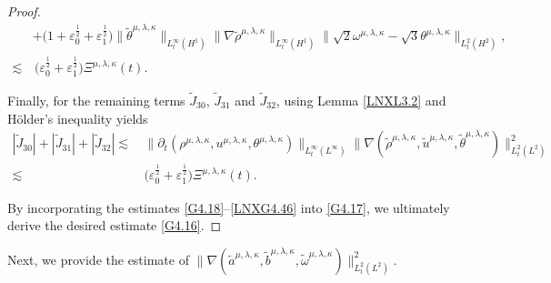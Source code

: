 \documentclass[reqno,11pt]{amsart}
\theoremstyle{plain}
\numberwithin{equation}{section}
\newcommand{\eps}{{\varepsilon}}
\begin{document}
\begin{proof}
\begin{align}
&+\big(1+\eps_0^\frac{1}{2}+\eps_1^\frac{1}{2}\big)\|\widetilde{\theta}^{\mu,\lambda,\kappa}\|_{L_t^\infty(H^1)} \|\nabla\widetilde{\rho}^{\mu,\lambda,\kappa}\|_{L_t^\infty(H^1)}  \|\sqrt{2} {\omega}^{\mu,\lambda,\kappa} -\sqrt{3} {\theta}^{\mu,\lambda,\kappa} \|_{L_t^2(H^2)} ,\nonumber\\
\lesssim&\, \big(\eps_0^\frac{1}{2}+\eps_1^\frac{1}{2}\big){\Xi} ^{\mu,\lambda,\kappa}(t). \label{G4.23}
\end{align} 

Finally, for the remaining terms $\widetilde{J}_{30}$, $\widetilde{J}_{31}$ and $\widetilde{J}_{32}$, using Lemma \ref{LNXL3.2} and H\"{o}lder's inequality yields
\begin{align}\label{LNXG4.46}
|\widetilde{J}_{30}|+|\widetilde{J}_{31}|+|\widetilde{J}_{32}|\lesssim&\, \|\partial_t (\rho^{\mu,\lambda,\kappa},u^{\mu,\lambda,\kappa},\theta^{\mu,\lambda,\kappa})\|_{L_t^\infty(L^\infty)}  \|\nabla(\widetilde\rho^{\mu,\lambda,\kappa},\widetilde u^{\mu,\lambda,\kappa},\widetilde\theta^{\mu,\lambda,\kappa})\|_{L_t^2(L^2)}^2  \nonumber\\
\lesssim&\,\big(\eps_0^\frac{1}{2}+\eps_1^\frac{1}{2}\big){\Xi} ^{\mu,\lambda,\kappa}(t). 
\end{align} 

By incorporating the estimates  \eqref{G4.18}--\eqref{LNXG4.46} into \eqref{G4.17}, we ultimately derive the desired estimate \eqref{G4.16}.
\end{proof}

Next, we provide the estimate of $ \|\nabla(\widetilde{a}^{\mu,\lambda,\kappa},\widetilde{b}^{\mu,\lambda,\kappa},\widetilde{\omega}^{\mu,\lambda,\kappa}) \|_{L^2_t(L^2)}^2 $.
\end{document}
